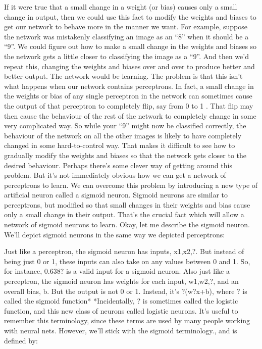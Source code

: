 If it were true that a small change in a weight (or bias) causes only a small change in output, then we could use this fact to modify the weights and biases to get our network to behave more in the manner we want. For example, suppose the network was mistakenly classifying an image as an ``8'' when it should be a ``9''. We could figure out how to make a small change in the weights and biases so the network gets a little closer to classifying the image as a ``9''. And then we'd repeat this, changing the weights and biases over and over to produce better and better output. The network would be learning.
The problem is that this isn't what happens when our network contains perceptrons. In fact, a small change in the weights or bias of any single perceptron in the network can sometimes cause the output of that perceptron to completely flip, say from 0 to 1
. That flip may then cause the behaviour of the rest of the network to completely change in some very complicated way. So while your ``9'' might now be classified correctly, the behaviour of the network on all the other images is likely to have completely changed in some hard-to-control way. That makes it difficult to see how to gradually modify the weights and biases so that the network gets closer to the desired behaviour. Perhaps there's some clever way of getting around this problem. But it's not immediately obvious how we can get a network of perceptrons to learn.
We can overcome this problem by introducing a new type of artificial neuron called a sigmoid neuron. Sigmoid neurons are similar to perceptrons, but modified so that small changes in their weights and bias cause only a small change in their output. That's the crucial fact which will allow a network of sigmoid neurons to learn.
Okay, let me describe the sigmoid neuron. We'll depict sigmoid neurons in the same way we depicted perceptrons: 

Just like a perceptron, the sigmoid neuron has inputs, x1,x2,?. But instead of being just 0 or 1, these inputs can also take on any values between 0 and 1. So, for instance, 0.638? is a valid input for a sigmoid neuron. Also just like a perceptron, the sigmoid neuron has weights for each input, w1,w2,?, and an overall bias, b. But the output is not 0 or 1. Instead, it's ?(w?x+b), where ? is called the sigmoid function* *Incidentally, ? is sometimes called the logistic function, and this new class of neurons called logistic neurons. It's useful to remember this terminology, since these terms are used by many people working with neural nets. However, we'll stick with the sigmoid terminology., and is defined by: 


